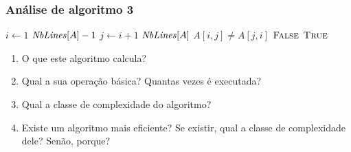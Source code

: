 \documentclass[handout]{beamer}
\begin{document}
\begin{frame}
\frametitle{Análise de algoritmo 3}

\begin{problem}
\begin{codebox}
\li \For $i \gets 1$ \To $\id{NbLines}[A]-1$
\li \Do
      \For $j \gets i+1$ \To $\id{NbLines}[A]$
\li   \Do
        \If $A[i,j] \neq A[j,i]$  \Return $\textnormal{\scshape False}$
      \End
    \End
\li \Return $\textnormal{\scshape True}$
\end{codebox}
\begin{enumerate}
\item O que este algoritmo calcula?
\item Qual a sua operação básica? Quantas vezes é executada?
\item Qual a classe de complexidade do algoritmo?
\item Existe um algoritmo mais eficiente? Se existir, qual a classe de complexidade dele? Senão, porque?
\end{enumerate}
\end{problem}
\end{frame}
\end{document}
